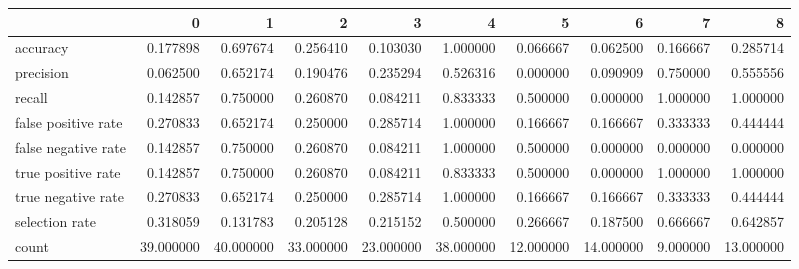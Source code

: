 \begin{tabular}{lrrrrrrrrr}
\toprule
{} &          0 &          1 &          2 &          3 &          4 &          5 &          6 &         7 &          8 \\
\midrule
accuracy            &   0.177898 &   0.697674 &   0.256410 &   0.103030 &   1.000000 &   0.066667 &   0.062500 &  0.166667 &   0.285714 \\
precision           &   0.062500 &   0.652174 &   0.190476 &   0.235294 &   0.526316 &   0.000000 &   0.090909 &  0.750000 &   0.555556 \\
recall              &   0.142857 &   0.750000 &   0.260870 &   0.084211 &   0.833333 &   0.500000 &   0.000000 &  1.000000 &   1.000000 \\
false positive rate &   0.270833 &   0.652174 &   0.250000 &   0.285714 &   1.000000 &   0.166667 &   0.166667 &  0.333333 &   0.444444 \\
false negative rate &   0.142857 &   0.750000 &   0.260870 &   0.084211 &   1.000000 &   0.500000 &   0.000000 &  0.000000 &   0.000000 \\
true positive rate  &   0.142857 &   0.750000 &   0.260870 &   0.084211 &   0.833333 &   0.500000 &   0.000000 &  1.000000 &   1.000000 \\
true negative rate  &   0.270833 &   0.652174 &   0.250000 &   0.285714 &   1.000000 &   0.166667 &   0.166667 &  0.333333 &   0.444444 \\
selection rate      &   0.318059 &   0.131783 &   0.205128 &   0.215152 &   0.500000 &   0.266667 &   0.187500 &  0.666667 &   0.642857 \\
count               &  39.000000 &  40.000000 &  33.000000 &  23.000000 &  38.000000 &  12.000000 &  14.000000 &  9.000000 &  13.000000 \\
\bottomrule
\end{tabular}
